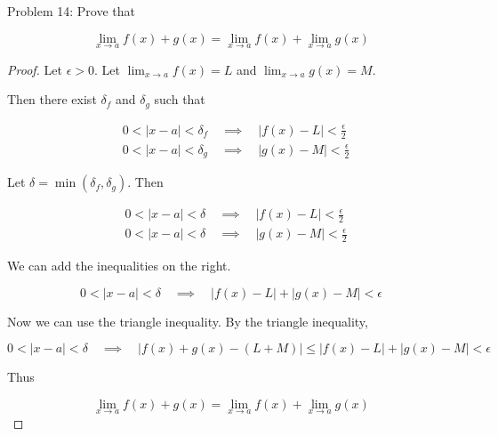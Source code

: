 \usepackage{amsthm}

Problem 14: Prove that 

$$ \lim_{x \rightarrow a} f(x) + g(x) = \lim_{x \rightarrow a} f(x) + \lim_{x \rightarrow a} g(x) $$

\begin{proof}
Let $\epsilon > 0$. Let $\lim_{x \rightarrow a} f(x) = L$ and $\lim_{x \rightarrow a} g(x) = M$. 

Then there exist $\delta_f$ and $\delta_g$ such that

\begin{align}
& 0 < |x - a| < \delta_f \quad \implies \quad |f(x) - L| < \frac{\epsilon}{2} \\ 
& 0 < |x - a| < \delta_g \quad \implies \quad |g(x) - M| < \frac{\epsilon}{2}
\end{align}

Let $\delta = \min(\delta_f, \delta_g)$. Then

\begin{align}
& 0 < |x - a| < \delta \quad \implies \quad |f(x) - L| < \frac{\epsilon}{2} \\ 
& 0 < |x - a| < \delta \quad \implies \quad |g(x) - M| < \frac{\epsilon}{2}
\end{align}

We can add the inequalities on the right.

$$ 0 < |x - a| < \delta \quad \implies \quad |f(x) - L| + |g(x) - M| < \epsilon $$

Now we can use the triangle inequality. By the triangle inequality,

$$ 0 < |x - a| < \delta \quad \implies \quad |f(x) + g(x) - (L + M)| \leq |f(x) - L| + |g(x) - M| < \epsilon $$

Thus

$$ \lim_{x \rightarrow a} f(x) + g(x) = \lim_{x \rightarrow a} f(x) + \lim_{x \rightarrow a} g(x) $$

\end{proof}
